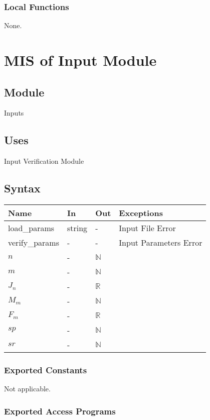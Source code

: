 \documentclass[12pt, titlepage]{article}
\begin{document}
\subsubsection{Local Functions}

None.

\section{MIS of Input Module \label{mInput} }

\subsection{Module}

Inputs 

\subsection{Uses}
Input Verification Module

\subsection{Syntax}
\begin{tabular}{p{3cm} p{1cm} p{1cm} >{\raggedright\arraybackslash}p{9cm}}
\toprule
\textbf{Name} & \textbf{In} & \textbf{Out} & \textbf{Exceptions} \\
\midrule
load\_params & string & - &  Input File Error \\
verify\_params & - & - & Input Parameters Error\\
$n$ & -& $\mathbb{N}$\\
$m$ & -& $\mathbb{N}$\\
$J_n$ & -& $\mathbb{R}$\\
$M_m$ & - & $\mathbb{N}$\\
$F_m$ & - & $\mathbb{R}$\\
$sp$ & - & $\mathbb{N}$\\
$sr$ & - & $\mathbb{N}$\\
\bottomrule
\end{tabular}

\subsubsection{Exported Constants}
Not applicable.

\subsubsection{Exported Access Programs}
\end{document}
